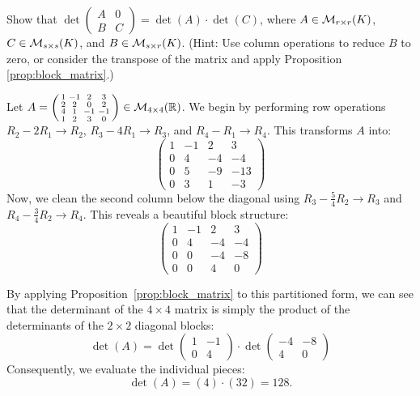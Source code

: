 \begin{remark}[Exercise]
  Show that $\det \left(\begin{smallmatrix} A & 0 \\ B & C \end{smallmatrix}\right) = \det(A) \cdot \det(C)$, where $A \in \mathcal{M}_{r \times r}(K)$, $C \in \mathcal{M}_{s \times s}(K)$, and $B \in \mathcal{M}_{s \times r}(K)$. (Hint: Use column operations to reduce $B$ to zero, or consider the transpose of the matrix and apply Proposition \ref{prop:block_matrix}.)
\end{remark}

\begin{example}
  Let $A = \left(\begin{smallmatrix} 1 & -1 & 2 & 3 \\ 2 & 2 & 0 & 2 \\ 4 & 1 & -1 & -1 \\ 1 & 2 & 3 & 0 \end{smallmatrix}\right) \in \mathcal{M}_{4 \times 4}(\mathbb{R})$.
  We begin by performing row operations $R_2 - 2R_1 \to R_2$, $R_3 - 4R_1 \to R_3$, and $R_4 - R_1 \to R_4$. This transforms $A$ into:
  \[
  \begin{pmatrix}
    1 & -1 & 2 & 3 \\
    0 & 4 & -4 & -4 \\
    0 & 5 & -9 & -13 \\
    0 & 3 & 1 & -3
  \end{pmatrix}
  \]
  Now, we clean the second column below the diagonal using $R_3 - \frac{5}{4}R_2 \to R_3$ and $R_4 - \frac{3}{4}R_2 \to R_4$. This reveals a beautiful block structure:
  \[
  \left(
  \begin{array}{cc|cc}
    1 & -1 & 2 & 3 \\
    0 & 4 & -4 & -4 \\ \hline
    0 & 0 & -4 & -8 \\
    0 & 0 & 4 & 0
  \end{array}
  \right)
  \]

  By applying Proposition~\ref{prop:block_matrix} to this partitioned form, we can see that the determinant of the $4 \times 4$ matrix is simply the product of the determinants of the $2 \times 2$ diagonal blocks:
  \[
  \det(A) = \det \begin{pmatrix} 1 & -1 \\ 0 & 4 \end{pmatrix} \cdot \det \begin{pmatrix} -4 & -8 \\ 4 & 0 \end{pmatrix}
  \]
  Consequently, we evaluate the individual pieces:
  \[
  \det(A) = (4) \cdot (32) = 128.
  \]
\end{example}



